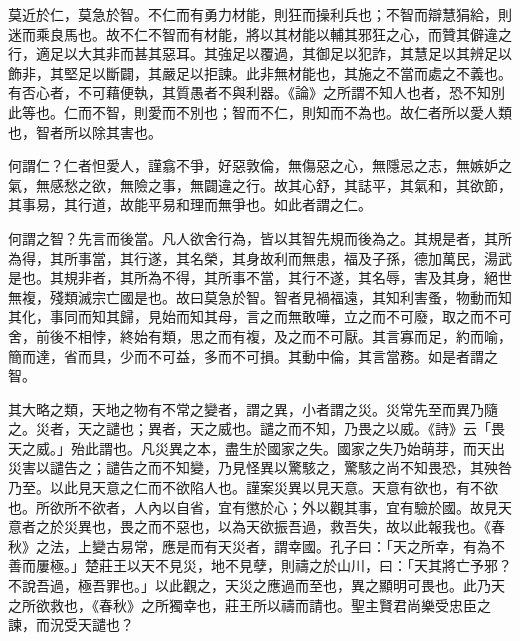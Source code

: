 
莫近於仁，莫急於智。不仁而有勇力材能，則狂而操利兵也；不智而辯慧狷給，則迷而乘良馬也。故不仁不智而有材能，將以其材能以輔其邪狂之心，而贊其僻違之行，適足以大其非而甚其惡耳。其強足以覆過，其御足以犯詐，其慧足以其辨足以飾非，其堅足以斷闢，其嚴足以拒諫。此非無材能也，其施之不當而處之不義也。有否心者，不可藉便執，其質愚者不與利器。《論》之所謂不知人也者，恐不知別此等也。仁而不智，則愛而不別也；智而不仁，則知而不為也。故仁者所以愛人類也，智者所以除其害也。


何謂仁？仁者怛愛人，謹翕不爭，好惡敦倫，無傷惡之心，無隱忌之志，無嫉妒之氣，無感愁之欲，無險之事，無闢違之行。故其心舒，其誌平，其氣和，其欲節，其事易，其行道，故能平易和理而無爭也。如此者謂之仁。

何謂之智？先言而後當。凡人欲舍行為，皆以其智先規而後為之。其規是者，其所為得，其所事當，其行遂，其名榮，其身故利而無患，福及子孫，德加萬民，湯武是也。其規非者，其所為不得，其所事不當，其行不遂，其名辱，害及其身，絕世無複，殘類滅宗亡國是也。故曰莫急於智。智者見禍福遠，其知利害蚤，物動而知其化，事同而知其歸，見始而知其母，言之而無敢嘩，立之而不可廢，取之而不可舍，前後不相悖，終始有類，思之而有複，及之而不可厭。其言寡而足，約而喻，簡而達，省而具，少而不可益，多而不可損。其動中倫，其言當務。如是者謂之智。


其大略之類，天地之物有不常之變者，謂之異，小者謂之災。災常先至而異乃隨之。災者，天之譴也；異者，天之威也。譴之而不知，乃畏之以威。《詩》云「畏天之威。」殆此謂也。凡災異之本，盡生於國家之失。國家之失乃始萌芽，而天出災害以譴告之；譴告之而不知變，乃見怪異以驚駭之，驚駭之尚不知畏恐，其殃咎乃至。以此見天意之仁而不欲陷人也。謹案災異以見天意。天意有欲也，有不欲也。所欲所不欲者，人內以自省，宜有懲於心；外以觀其事，宜有驗於國。故見天意者之於災異也，畏之而不惡也，以為天欲振吾過，救吾失，故以此報我也。《春秋》之法，上變古易常，應是而有天災者，謂幸國。孔子曰：「天之所幸，有為不善而屢極。」楚莊王以天不見災，地不見孽，則禱之於山川，曰：「天其將亡予邪？不說吾過，極吾罪也。」以此觀之，天災之應過而至也，異之顯明可畏也。此乃天之所欲救也，《春秋》之所獨幸也，莊王所以禱而請也。聖主賢君尚樂受忠臣之諫，而況受天譴也？


